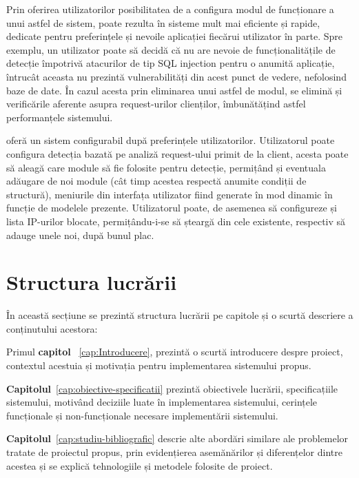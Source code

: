 Prin oferirea utilizatorilor posibilitatea de a configura modul de funcționare a unui astfel de sistem, poate rezulta în sisteme mult mai eficiente și rapide, dedicate pentru preferințele și nevoile aplicației fiecărui utilizator în parte. Spre exemplu, un utilizator poate să decidă că nu are nevoie de funcționalitățile de detecție împotrivă atacurilor de tip SQL injection pentru o anumită aplicație, întrucât aceasta nu prezintă vulnerabilități din acest punct de vedere, nefolosind baze de date. În cazul acesta prin eliminarea unui astfel de modul, se elimină și verificările aferente asupra request-urilor clienților, îmbunătățind astfel performanțele sistemului. 

\textit{\thesistitle}  oferă un sistem configurabil după preferințele utilizatorilor. Utilizatorul poate configura detecția bazată pe analiză request-ului primit de la client, acesta poate să aleagă care module să fie folosite pentru detecție, permițând și eventuala adăugare de noi module (cât timp acestea respectă anumite condiții de structură), meniurile din interfața utilizator fiind generate în mod dinamic în funcție de modelele prezente. Utilizatorul poate, de asemenea să configureze și lista IP-urilor blocate, permițându-i-se să șteargă din cele existente, respectiv să adauge unele noi, după bunul plac. 


 \section{Structura lucrării}
În această secțiune se prezintă structura lucrării pe capitole și o scurtă descriere a conținutului acestora: 

Primul \textbf{capitol} ~\ref{cap:Introducere},  prezintă o scurtă introducere despre proiect, contextul acestuia și motivația pentru implementarea sistemului propus. 

\textbf{Capitolul}~\ref{cap:obiective-specificatii}  prezintă obiectivele lucrării, specificațiile sistemului, motivând deciziile luate în implementarea sistemului, cerințele funcționale și non-funcționale necesare implementării sistemului. 

\textbf{Capitolul}~\ref{cap:studiu-bibliografic}  descrie alte abordări similare ale problemelor tratate de proiectul propus, prin evidențierea asemănărilor și diferențelor dintre acestea și se explică tehnologiile și metodele folosite de proiect. 
 
